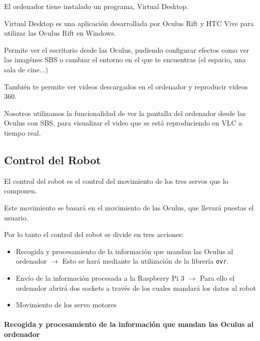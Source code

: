 \documentclass[twoside, 12pt]{epstfg}
\begin{document}
El ordenador tiene instalado un programa, Virtual Desktop.

Virtual Desktop es una aplicación desarrollada por Oculus Rift y  HTC Vive para utilizar las Oculus Rift en Windows.

Permite ver el escritorio desde las Oculus, pudiendo configurar efectos como ver las imagénes SBS o cambiar el entorno en el que te encuentras (el espacio, una sala de cine...)



También te permite ver videos descargados en el ordenador y reproducir videos 360.

Nosotros utilizamos la funcionalidad de ver la pantalla del ordenador desde las Oculus con SBS, para visualizar el video que se está reproduciendo en VLC a tiempo real.



\newpage

\subsection{Control del Robot}
El control del robot es el control del movimiento de los tres servos que lo componen. 

Este movimiento se basará en el movimiento de las Oculus, que llevará puestas el usuario.

Por lo tanto el control del robot se divide en tres acciones:
\begin{itemize}
	\item Recogida y procesamiento de la información que mandan las Oculus al ordenador $\rightarrow$ Esto se hará mediante la utilización de la librería \texttt{ovr}.
	
	\item Envío de la información procesada a la Raspberry Pi 3 $\rightarrow$ Para ello el ordenador abrirá dos sockets a través de los cuales mandará los datos al robot
	
	\item Movimiento de los servo motores
\end{itemize}
\paragraph{Recogida y procesamiento de la información que mandan las Oculus al ordenador}
\end{document}
